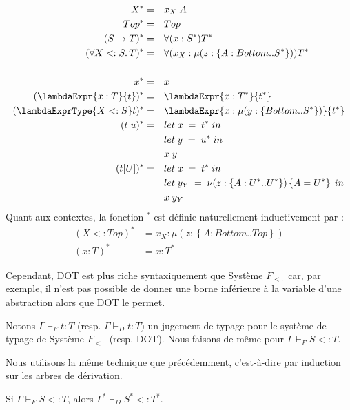 \begin{align*}
  X^{*} & = && x_{X}.A \\
  Top^{*} & = && Top \\
  (S \rightarrow T)^{*} & = && \forall(x : S^{*}) T^{*} \\
  (\forall X <: S . \, T)^{*} & = && \forall(x_{X} : \mu(z : \left\{ A : Bottom .. S^{*} \right\})) T^{*} \\ \\
  x^{*} & = && x \\
  (\lambdaExpr{x : T}{t})^{*} & = && \lambdaExpr{x : T^{*}}{t^{*}} \\
  (\lambdaExprType{X <: S}t)^{*} & = && \lambdaExpr{x : \mu(y : \left\{ Bottom .. S^ {*} \right\})}{t^{*}} \\
  (t \; u)^{*} & = && let \; x \; = \; t^{*} \; in \\
              &  && let \; y \; = \; u^{*} \; in \\
              &  && x \; y \\
   (t[U])^{*}  & = && let \; x \; = \; t^{*} \; in \\
              &  && let \; y_{Y} \; = \; \nu(z : \left\{ A : U^{*} .. U^{*} \right\}) \left\{ A = U^{*} \right\} \; in \\
              &  && x \; y_{Y}
\end{align*}
Quant aux contextes, la fonction ${}^{*}$ est définie naturellement
inductivement par :
\begin{align*}
  (X <: Top)^{*} & = x_{X} : \mu(z : \left\{ A : Bottom .. Top \right\}) \\
  (x : T)^{*} & = x : T^{*}
\end{align*}

Cependant, DOT est plus riche syntaxiquement que Système $F_{<:}$ car, par
exemple, il n'est pas possible de donner une borne inférieure à la variable
d'une abstraction alors que DOT le permet.


Notons $\Gamma \vdash_{F} t : T$ (resp. $\Gamma \vdash_{D} t : T$) un jugement
de typage pour le système de typage de Système $F_{<:}$ (resp. DOT). Nous faisons
de même pour $\Gamma \vdash_{F} S <: T$.

Nous utilisons la même technique que précédemment, c'est-à-dire par induction
sur les arbres de dérivation.
\begin{theorem}
  Si $\Gamma \vdash_{F} S <: T$, alors $\Gamma^{*} \vdash_{D} S^{*} <: T^{*}$.
\end{theorem}


